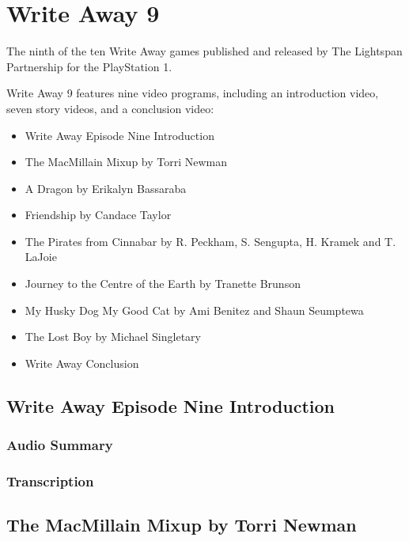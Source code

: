 \chapter{Write Away 9}


The ninth of the ten Write Away games published and released by The Lightspan Partnership for the PlayStation 1.

Write Away 9 features nine video programs, including an introduction video, seven story videos, and a conclusion video:

\begin{itemize}
    \item Write Away Episode Nine Introduction
    \item The MacMillain Mixup by Torri Newman
    \item A Dragon by Erikalyn Bassaraba
    \item Friendship by Candace Taylor
    \item The Pirates from Cinnabar by R. Peckham, S. Sengupta, H. Kramek and T. LaJoie
    \item Journey to the Centre of the Earth by Tranette Brunson
    \item My Husky Dog My Good Cat by Ami Benitez and Shaun Seumptewa
    \item The Lost Boy by Michael Singletary
    \item Write Away Conclusion
\end{itemize}

\clearpage
\newpage

\section{Write Away Episode Nine Introduction}

\subsection{Audio Summary}

\subsection{Transcription}

\section{The MacMillain Mixup by Torri Newman}

